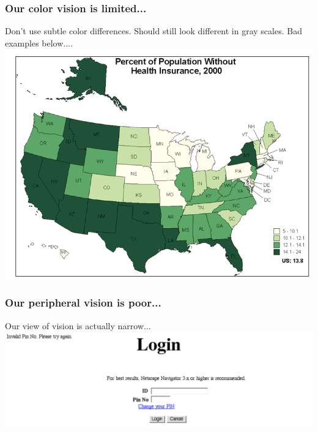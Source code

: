 \documentclass{beamer}
\begin{document}
\begin{frame}
\frametitle{Our color vision is limited...}
Don't use subtle color differences.  Should still look different in gray scales.  Bad examples below....
\vfill
\centering
\includegraphics[width=0.6\linewidth]{image/colorblind4}
\end{frame}



\begin{frame}
\frametitle{Our peripheral vision is poor...}
Our view of vision is actually narrow...
\vfill
\centering
\includegraphics[width=1\linewidth]{image/peripheral}
\end{frame}

\end{document}
